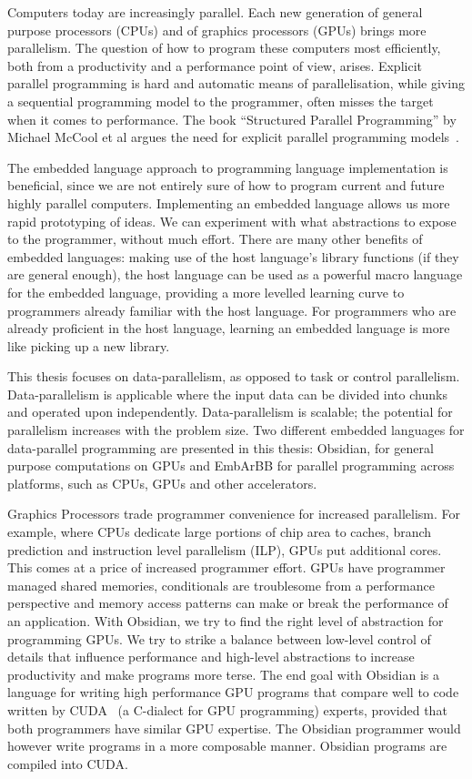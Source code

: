 \documentclass[a4paper]{book}
\begin{document}
Computers today are increasingly parallel. Each new generation of general purpose processors
(CPUs) and of graphics processors (GPUs) brings more parallelism. The question 
of how to program these computers most efficiently, both from a productivity and 
a performance point of view, arises. Explicit parallel programming is hard and automatic 
means of parallelisation, while giving a sequential programming model to the programmer, 
often misses the target when it comes to performance. The book ``Structured Parallel 
Programming'' by Michael McCool et al argues the need for explicit parallel programming 
models~\citet{STRUCTURED}.

The embedded language approach to programming language implementation is beneficial, 
since we are not entirely sure of how to program current and future highly parallel 
computers. Implementing an embedded language allows us more rapid prototyping of ideas. 
We can experiment with what abstractions to expose to the programmer, without much 
effort. There are many other benefits of embedded languages: making use 
of the host language's library functions (if they are general enough), the host language 
can be used as a powerful macro language for the embedded language, providing a more 
levelled learning curve to programmers already familiar with the host language. 
For programmers who are already proficient in the host language, learning an embedded 
language is more like picking up a new library. 

This thesis focuses on data-parallelism, as opposed to task or control parallelism.
Data-parallelism is applicable where the input data can be divided into chunks
and operated upon independently. Data-parallelism is scalable; the potential 
for parallelism increases with the problem size. Two different embedded languages 
for data-parallel programming are presented in this thesis: Obsidian, for 
general purpose computations on GPUs and EmbArBB for parallel programming across 
platforms, such as CPUs, GPUs and other accelerators. 

Graphics Processors trade programmer convenience for increased parallelism. 
For example, where CPUs dedicate large portions of chip area to caches, branch 
prediction and instruction level parallelism (ILP), GPUs put additional cores. 
This comes at a price of increased programmer effort. GPUs have programmer managed 
shared memories, conditionals are troublesome from a performance 
perspective and memory access patterns can make or break the performance of an 
application. With Obsidian, we try to find the right level of abstraction for 
programming GPUs. We try to strike a balance between low-level control of details 
that influence performance and high-level abstractions to increase productivity and 
make programs more terse. The end goal with Obsidian is a language for writing 
high performance GPU programs that compare well to code written by CUDA~\citet{CUDA}  
(a C-dialect for GPU programming) experts, provided that both programmers have 
similar GPU expertise. The Obsidian programmer would however write programs in a more 
composable manner. Obsidian programs are compiled into CUDA.  
\end{document}
